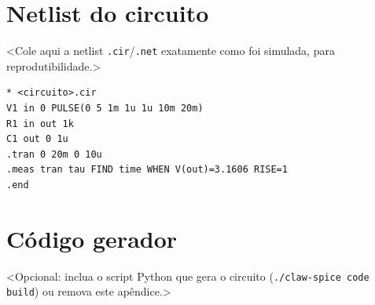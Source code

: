 \chapter{Netlist do circuito}
\label{ap:netlist}

<Cole aqui a netlist \texttt{.cir}/\texttt{.net} exatamente como foi
simulada, para reprodutibilidade.>

\begin{verbatim}
* <circuito>.cir
V1 in 0 PULSE(0 5 1m 1u 1u 10m 20m)
R1 in out 1k
C1 out 0 1u
.tran 0 20m 0 10u
.meas tran tau FIND time WHEN V(out)=3.1606 RISE=1
.end
\end{verbatim}

\chapter{Código gerador}
\label{ap:codigo}

<Opcional: inclua o script Python que gera o circuito
(\texttt{./claw-spice code build}) ou remova este apêndice.>
